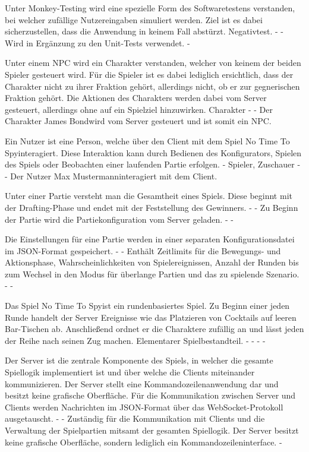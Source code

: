 {Unter Monkey-Testing wird eine spezielle Form des Softwaretestens verstanden, bei welcher zufällige Nutzereingaben simuliert werden. Ziel ist es dabei sicherzustellen, dass die Anwendung in keinem Fall abstürzt.}
{Negativtest.}
{-}
{-}
{Wird in Ergänzung zu den Unit-Tests verwendet.}
{-}

{Unter einem NPC wird ein Charakter verstanden, welcher von keinem der beiden Spieler gesteuert wird. Für die Spieler ist es dabei lediglich ersichtlich, dass der Charakter nicht zu ihrer Fraktion gehört, allerdings nicht, ob er zur gegnerischen Fraktion gehört. Die Aktionen des Charakters werden dabei vom Server gesteuert, allerdings ohne auf ein Spielziel hinzuwirken.}
{Charakter}
{-}
{-}
{Der Charakter \glqq James Bond\grqq wird vom Server gesteuert und ist somit ein NPC.}

{Ein Nutzer ist eine Person, welche über den Client mit dem Spiel  \glqq No Time To Spy\grqq interagiert. Diese Interaktion kann durch Bedienen des Konfigurators, Spielen des Spiels oder Beobachten einer laufenden Partie erfolgen.}
{-}
{Spieler, Zuschauer}
{-}
{-}
{Der Nutzer \glqq Max Mustermann\grqq interagiert mit dem Client.}

{Unter einer Partie versteht man die Gesamtheit eines Spiels. Diese beginnt mit der Drafting-Phase und endet mit der Feststellung des Gewinners.}
{-}
{-}
{Zu Beginn der Partie wird die Partiekonfiguration vom Server geladen.}
{-}
{-}

{Die Einstellungen für eine Partie werden in einer separaten Konfigurationsdatei im JSON-Format gespeichert. }
{-}
{-}
{Enthält Zeitlimits für die Bewegungs- und Aktionsphase, Wahrscheinlichkeiten von Spielereignissen, Anzahl der Runden bis zum Wechsel in den Modus für überlange Partien und das zu spielende Szenario.}
{-}
{-}

{Das Spiel \glqq No Time To Spy\grqq ist ein rundenbasiertes Spiel. Zu Beginn einer jeden Runde handelt der Server Ereignisse wie das Platzieren von Cocktails auf leeren Bar-Tischen ab. Anschließend ordnet er die Charaktere zufällig an und lässt jeden der Reihe nach seinen Zug machen. }
{Elementarer Spielbestandteil.}
{-}
{-}
{-}
{-}

{Der Server ist die zentrale Komponente des Spiels, in welcher die gesamte Spiellogik implementiert ist und über welche die Clients miteinander kommunizieren. Der Server stellt eine Kommandozeilenanwendung dar und besitzt keine grafische Oberfläche. Für die Kommunikation zwischen Server und Clients werden Nachrichten im JSON-Format über das WebSocket-Protokoll ausgetauscht.}
{-}
{-}
{Zuständig für die Kommunikation mit Clients und die Verwaltung der Spielpartien mitsamt der gesamten Spiellogik.}
{Der Server besitzt keine grafische Oberfläche, sondern lediglich ein Kommandozeileninterface.}
{-}

